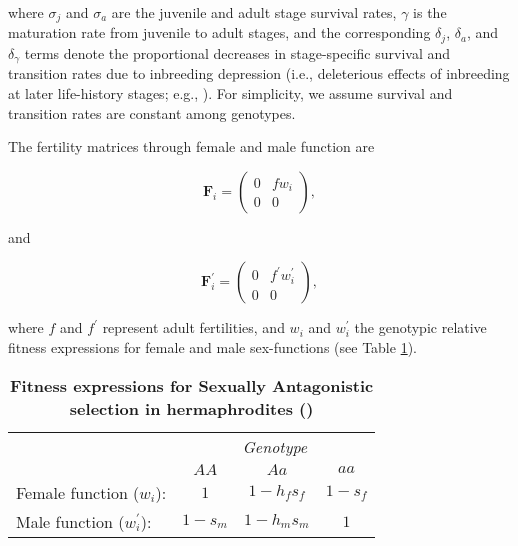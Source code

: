 \documentclass[11pt]{article}
\def\mbf#1{\mathbf{#1}}
\begin{document}
\noindent where $\sigma_j$ and $\sigma_a$ are the juvenile and adult stage survival rates, $\gamma$ is the maturation rate from juvenile to adult stages, and the corresponding $\delta_j$, $\delta_a$, and $\delta_{\gamma}$ terms denote the proportional decreases in stage-specific survival and transition rates due to inbreeding depression (i.e., deleterious effects of inbreeding at later life-history stages; e.g., \citealt{HarderRoutely2006}). For simplicity, we assume survival and transition rates are constant among genotypes. 

The fertility matrices through female and male function are
\begin{linenomath*}
\begin{equation}\label{eq:FS}
	\mbf{F}_{i} = \left(
					\begin{array}{cc}
						0 & f w_{i} \\
						0 & 0
					\end{array}
				\right),
\end{equation}
\end{linenomath*}
\noindent and
\begin{linenomath*}
\begin{equation}\label{eq:FX}
	\mbf{F}^{\prime}_{i} = \left(
					\begin{array}{cc}
						0 & f^{\prime} w^{\prime}_{i} \\
						0 & 0
					\end{array}
				\right),
\end{equation}
\end{linenomath*}

\noindent where $f$ and $f^{\prime}$ represent adult fertilities, and $w_{i}$ and $w^{\prime}_{i}$ the genotypic relative fitness expressions for female and male sex-functions (see Table \ref{tab:Fitness}). 

\begin{table}[htbp]
 \centering
 \caption{\bf Fitness expressions for Sexually Antagonistic selection in hermaphrodites ()}
\label{tab:Fitness}
\begin{tabular}{lccc}
 \toprule
					&  \multicolumn{3}{c}{{\textit{Genotype}}} \\ 
\cline{2-4}
					& $AA$			& $Aa$ 					& $aa$ 		\\ \hline
Female function ($w_{i}$):	& $1$		& $1 - h_f s_f$	& $1 - s_f$ \\	
Male function ($w^{\prime}_{i}$):		& $1 - s_m$& $1 - h_m s_m$	& $1$ 		\\	
\hline
\end{tabular}
\end{table}
\end{document}
